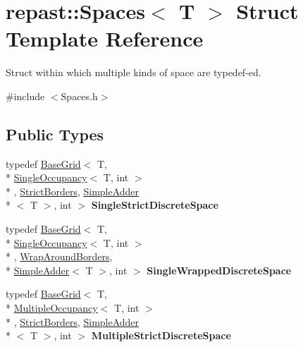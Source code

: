 \hypertarget{structrepast_1_1_spaces}{\section{repast\-:\-:Spaces$<$ T $>$ Struct Template Reference}
\label{structrepast_1_1_spaces}
}


Struct within which multiple kinds of space are typedef-\/ed.  




{\ttfamily \#include $<$Spaces.\-h$>$}

\subsection*{Public Types}
\begin{DoxyCompactItemize}
\item 
\hypertarget{structrepast_1_1_spaces_ace7bbd668bbb81f088e52935e751422d}{typedef \hyperlink{classrepast_1_1_base_grid}{Base\-Grid}$<$ T, \\*
\hyperlink{classrepast_1_1_single_occupancy}{Single\-Occupancy}$<$ T, int $>$\\*
, \hyperlink{classrepast_1_1_strict_borders}{Strict\-Borders}, \hyperlink{classrepast_1_1_simple_adder}{Simple\-Adder}\\*
$<$ T $>$, int $>$ {\bfseries Single\-Strict\-Discrete\-Space}}\label{structrepast_1_1_spaces_ace7bbd668bbb81f088e52935e751422d}

\item 
\hypertarget{structrepast_1_1_spaces_a5fe71aa2df9f315229e18da9834c8c7c}{typedef \hyperlink{classrepast_1_1_base_grid}{Base\-Grid}$<$ T, \\*
\hyperlink{classrepast_1_1_single_occupancy}{Single\-Occupancy}$<$ T, int $>$\\*
, \hyperlink{classrepast_1_1_wrap_around_borders}{Wrap\-Around\-Borders}, \\*
\hyperlink{classrepast_1_1_simple_adder}{Simple\-Adder}$<$ T $>$, int $>$ {\bfseries Single\-Wrapped\-Discrete\-Space}}\label{structrepast_1_1_spaces_a5fe71aa2df9f315229e18da9834c8c7c}

\item 
\hypertarget{structrepast_1_1_spaces_a141a29c78ed7a7cf041f8a2f0357277d}{typedef \hyperlink{classrepast_1_1_base_grid}{Base\-Grid}$<$ T, \\*
\hyperlink{classrepast_1_1_multiple_occupancy}{Multiple\-Occupancy}$<$ T, int $>$\\*
, \hyperlink{classrepast_1_1_strict_borders}{Strict\-Borders}, \hyperlink{classrepast_1_1_simple_adder}{Simple\-Adder}\\*
$<$ T $>$, int $>$ {\bfseries Multiple\-Strict\-Discrete\-Space}}\label{structrepast_1_1_spaces_a141a29c78ed7a7cf041f8a2f0357277d}


\end{DoxyCompactItemize}
